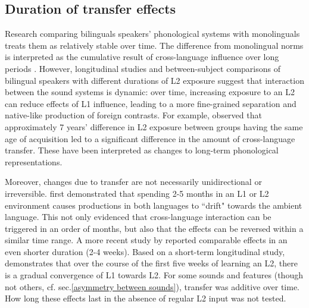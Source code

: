 \documentclass[12 pt]{article}
\begin{document}
\subsection{Duration of transfer effects} \label{duration}

Research comparing bilinguals speakers' phonological systems with monolinguals treats them as relatively stable over time. The difference from monolingual norms is interpreted as the cumulative result of cross-language influence over long periods \citep[e.g.][]{guion2003vowel, caramazza1973acquisition}. However, longitudinal studies %
and between-subject comparisons of bilingual speakers with different durations of L2 exposure suggest that interaction between the sound systems is dynamic: over time, increasing exposure to an L2 can reduce effects of L1 influence, leading to a more fine-grained separation and native-like production of foreign contrasts. For example, \cite{bohn1992production} 
observed that approximately 7 years' difference in L2 exposure between groups having the same age of acquisition led to a significant difference in the amount of cross-language transfer. These have been interpreted as changes to long-term phonological representations.

Moreover, changes due to transfer are not necessarily unidirectional or irreversible. \cite{sancier1997gestural} first demonstrated that spending 2-5 months in an L1 or L2 environment causes productions in both languages to ``drift" towards the ambient language. This not only evidenced that cross-language interaction can be triggered in an order of months, but also that the effects can be reversed within a similar time range. A more recent study by \cite{tobin2017phonetic} reported comparable effects in an even shorter duration (2-4 weeks). Based on a short-term longitudinal study, \cite{chang2012rapid} demonstrates that over the course of the first five weeks of learning an L2, there is a gradual convergence of L1 towards L2. For some sounds and features (though not others, cf. sec.\ref{asymmetry between sounds}), transfer was additive over time. How long these effects last in the absence of regular L2 input was not tested. 
\end{document}
